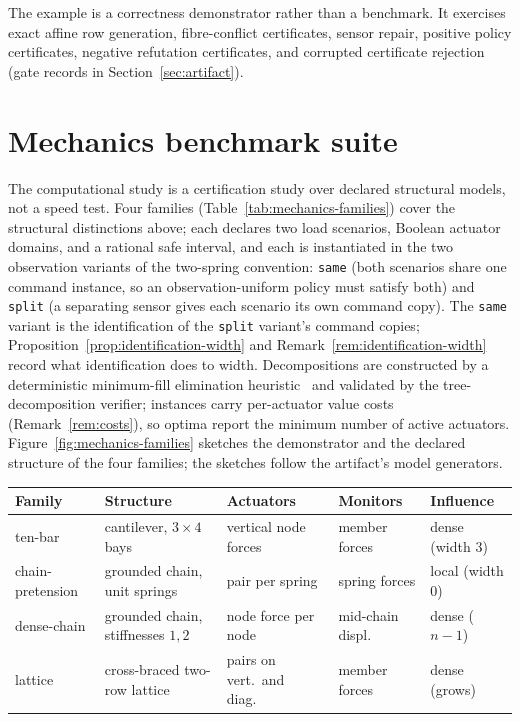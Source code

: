 \documentclass[11pt]{article}
\theoremstyle{plain}
\theoremstyle{definition}
\theoremstyle{remark}
\begin{document}
The example is a correctness demonstrator rather than a benchmark.  It exercises
exact affine row generation, fibre-conflict certificates, sensor repair,
positive policy certificates, negative refutation certificates, and corrupted
certificate rejection (gate records in Section~\ref{sec:artifact}).

\section{Mechanics benchmark suite}
\label{sec:mechanics-benchmarks}

The computational study is a certification study over declared structural
models, not a speed test.  Four families (Table~\ref{tab:mechanics-families})
cover the structural distinctions
above; each declares two load scenarios, Boolean actuator domains, and a
rational safe interval, and each is instantiated in the two observation
variants of the two-spring convention: \texttt{same} (both scenarios share
one command instance, so an observation-uniform policy must satisfy both) and
\texttt{split} (a separating sensor gives each scenario its own command
copy).  The \texttt{same} variant is the identification of the \texttt{split}
variant's command copies; Proposition~\ref{prop:identification-width} and
Remark~\ref{rem:identification-width} record what identification does to
width.  Decompositions are constructed by a deterministic minimum-fill
elimination heuristic~\cite{george73,liptontarjan79} and validated by the
tree-decomposition verifier;
instances carry per-actuator value costs (Remark~\ref{rem:costs}), so optima
report the minimum number of active actuators.  Figure~\ref{fig:mechanics-families}
sketches the demonstrator and the declared structure of the four families;
the sketches follow the artifact's model generators.

\begin{center}
\footnotesize
\begin{tabular}{@{}lllll@{}}
\toprule
Family & Structure & Actuators & Monitors & Influence\\
\midrule
ten-bar & cantilever, \(3\times4\) bays & vertical node forces & member forces & dense (width 3)\\
chain-pretension & grounded chain, unit springs & pair per spring & spring forces & local (width 0)\\
dense-chain & grounded chain, stiffnesses \(1,2\) & node force per node & mid-chain displ.\ & dense (\(n-1\))\\
lattice & cross-braced two-row lattice & pairs on vert.\ and diag.\ & member forces & dense (grows)\\
\bottomrule
\end{tabular}
\label{tab:mechanics-families}
\end{center}
\end{document}

